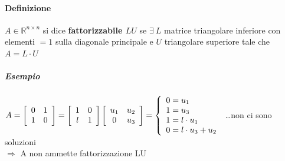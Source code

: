 \documentclass[10pt]{book}
\begin{document}
\paragraph{Definizione} $A \in \mathbb{R}^{n \times n}$ si dice \textbf{fattorizzabile $LU$} se $\exists\: L$ matrice triangolare inferiore con elementi $= 1$ sulla diagonale principale e $U$ triangolare superiore tale che $A = L\cdot U$
\subparagraph{Esempio} \begin{math}
A = \left[
\begin{array}{c c}
	0 & 1\\
	1 & 0
\end{array}
\right]
= \left[
\begin{array}{c c}
	1 & 0\\
	l & 1
\end{array}
\right]
\left[
\begin{array}{c c}
	u_1 & u_2\\
	0 & u_3
\end{array}
\right]
= \left\{
\begin{array}{l}
	0 = u_1\\
	1 = u_3\\
	1 = l\cdot u_1\\
	0 = l\cdot u_3 + u_2
\end{array}
\right.
\end{math}
\ldots non ci sono soluzioni\\
$\Rightarrow$ A non ammette fattorizzazione LU
\end{document}
